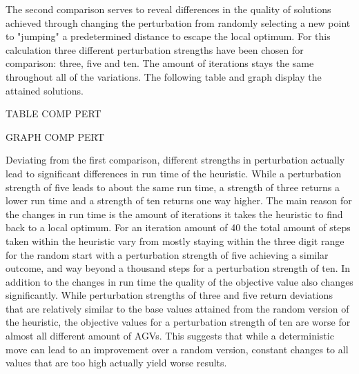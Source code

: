 The second comparison serves to reveal differences in the quality of solutions achieved through changing the perturbation from randomly selecting a new point to "jumping" a predetermined distance to escape the local optimum. For this calculation three different perturbation strengths have been chosen for comparison: three, five and ten. The amount of iterations stays the same throughout all of the variations. The following table and graph display the attained solutions.

TABLE COMP PERT

GRAPH COMP PERT

Deviating from the first comparison, different strengths in perturbation actually lead to significant differences in run time of the heuristic. While a perturbation strength of five leads to about the same run time, a strength of three returns a lower run time and a strength of ten returns one way higher. The main reason for the changes in run time is the amount of iterations it takes the heuristic to find back to a local optimum. For an iteration amount of 40 the total amount of steps taken within the heuristic vary from mostly staying within the three digit range for the random start with a perturbation strength of five achieving a similar outcome, and way beyond a thousand steps for a perturbation strength of ten. In addition to the changes in run time the quality of the objective value also changes significantly. While perturbation strengths of three and five return deviations that are relatively similar to the base values attained from the random version of the heuristic, the objective values for a perturbation strength of ten are worse for almost all different amount of AGVs. This suggests that while a deterministic move can lead to an improvement over a random version, constant changes to all values that are too high actually yield worse results.